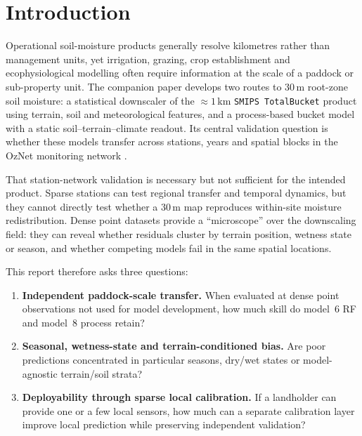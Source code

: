 \documentclass[11pt,a4paper]{article}
\newcommand{\modelSix}{model~6 RF}
\newcommand{\modelEight}{model~8 process}
\newcommand{\smips}{\texttt{SMIPS TotalBucket}}
\begin{document}
\section{Introduction}\label{sec:intro}

Operational soil-moisture products generally resolve kilometres rather than
management units, yet irrigation, grazing, crop establishment
and ecophysiological modelling often require information at the scale of a
paddock or sub-property unit.  The companion paper develops two routes to
30\,m root-zone soil moisture: a statistical downscaler of the
${\approx}1$\,km \smips{} product using terrain, soil and meteorological
features, and a process-based bucket model with a static soil--terrain--climate
readout.  Its central validation question is whether these models transfer
across stations, years and spatial blocks in the OzNet monitoring network
\citep{smith2012oznet}.

That station-network validation is necessary but not sufficient for the
intended product.  Sparse stations can test regional transfer and temporal
dynamics, but they cannot directly test whether a 30\,m map reproduces
within-site moisture redistribution.  Dense point datasets provide a
``microscope'' over the downscaling field: they can reveal whether residuals
cluster by terrain position, wetness state or season, and whether competing
models fail in the same spatial locations.

This report therefore asks three questions:

\begin{enumerate}
\item \textbf{Independent paddock-scale transfer.}  When evaluated at dense
  point observations not used for model development, how much skill do
  \modelSix{} and \modelEight{} retain?
\item \textbf{Seasonal, wetness-state and terrain-conditioned bias.}  Are poor
  predictions concentrated in particular seasons, dry/wet states or
  model-agnostic terrain/soil strata?
\item \textbf{Deployability through sparse local calibration.}  If a landholder
  can provide one or a few local sensors, how much can a separate calibration
  layer improve local prediction while preserving independent validation?
\end{enumerate}
\end{document}
